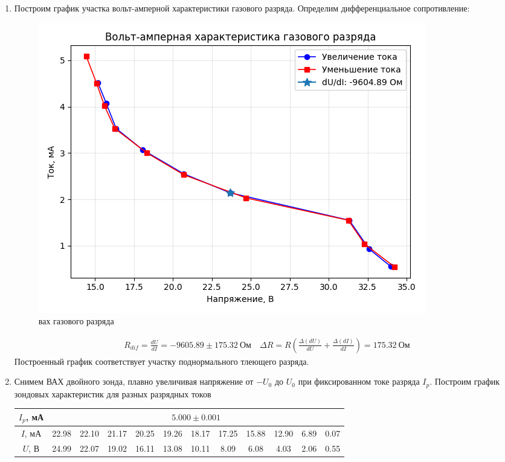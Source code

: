 \documentclass[a4paper, 12pt]{article}
\begin{document}
\begin{enumerate}
\begin{table}[htbp]
        \caption{Снятие ВАХ газового разряда в неоне}
        \label{Снятие ВАХ газового разряда в неоне}
    \end{table}
    \item Построим график участка вольт-амперной характеристики газового разряда. Определим дифференциальное сопротивление:
    \begin{figure}[htbp]
        \centering
        \includegraphics[width=0.7\linewidth]{vax.png}
        \caption{вах газового разряда}
        \label{вах газового разряда}
    \end{figure}
    \begin{align}
        R_{dif} = \frac{dU}{dI} = -9605.89 \pm 175.32\ \text{Ом} \quad \Delta R = R\left(\frac{\Delta(dU)}{dU} + \frac{\Delta(dI)}{dI}\right) = 175.32\ \text{Ом}
    \end{align}
    Построенный график соответствует участку поднормального тлеющего разряда.
    \newpage
    \item Снимем ВАХ двойного зонда, плавно увеличивая напряжение от $-U_{0}$ до $U_{0}$ при фиксированном токе разряда $I_{p}$. Построим график зондовых характеристик для разных разрядных токов
    \begin{table}[htbp]
        \centering
        \begin{tabular}{|c|c|c|c|c|c|c|c|c|c|c|c|}
            \hline
            $I_{p}$, мА & \multicolumn{11}{|c|}{$5.000\pm 0.001$}\\
            \hline
            $I$, мА & 22.98 & 22.10 & 21.17 & 20.25 & 19.26 & 18.17 & 17.25 & 15.88 & 12.90 & 6.89 & 0.07\\
            $U$, В & 24.99 & 22.07 & 19.02 & 16.11 & 13.08 & 10.11 & 8.09 & 6.08 & 4.03 & 2.06 & 0.55\\

\end{tabular}
\end{table}
\end{enumerate}
\end{document}
